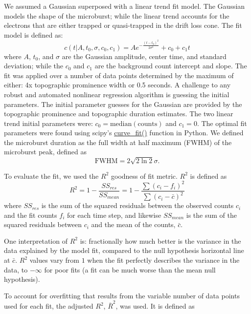 \documentclass[draft]{agujournal2019}
\begin{document}
We assumed a Gaussian superposed with a linear trend fit model. The Gaussian models the shape of the microburst; while the linear trend accounts for the electrons that are either trapped or quasi-trapped in the drift loss cone. The fit model is defined as:
\begin{equation}
c(t | A, t_0, \sigma, c_0, c_1) = A e^{-\frac{(t-t_0)^2}{2\sigma^2}} + c_0 + c_1 t
\end{equation} where $A$, $t_0$, and $\sigma$ are the Gaussian amplitude, center time, and standard deviation; while the $c_0$ and $c_1$ are the background count intercept and slope. The fit was applied over a number of data points determined by the maximum of either: 4x topographic prominence width or 0.5 seconds. A challenge to any robust and automated nonlinear regression algorithm is guessing the initial parameters. The initial parameter guesses for the Gaussian are provided by the topographic prominence and topographic duration estimates. The two linear trend initial parameters were: $c_0=\mathrm{median(counts)}$ and $c_1=0$. The optimal fit parameters were found using scipy's \url{curve_fit()} function in Python. We defined the microburst duration as the full width at half maximum (FWHM) of the microburst peak, defined as
\begin{equation}
\mathrm{FWHM} = 2\sqrt{2 \ln{2}} \sigma.
\end{equation}

To evaluate the fit, we used the $R^2$ goodness of fit metric. $R^2$ is defined as
\begin{equation}
R^2 = 1 - \frac{SS_{res}}{SS_{mean}} = 1 - \frac{\sum{(c_i-f_i)^2}}{\sum{(c_i-\bar{c})^2}}
\end{equation} where $SS_{res}$ is the sum of the squared residuals between the observed counts $c_i$ and the fit counts $f_i$ for each time step, and likewise $SS_{mean}$ is the sum of the squared residuals between $c_i$ and the mean of the counts, $\bar{c}$.

One interpretation of $R^2$ is: fractionally how much better is the variance in the data explained by the model fit, compared to the null hypothesis horizontal line at $\bar{c}$. $R^2$ values vary from $1$ when the fit perfectly describes the variance in the data, to $-\infty$ for poor fits (a fit can be much worse than the mean null hypothesis).

To account for overfitting that results from the variable number of data points used for each fit, the adjusted $R^2$, $\bar{R}^2$, was used. It is defined as
\end{document}

